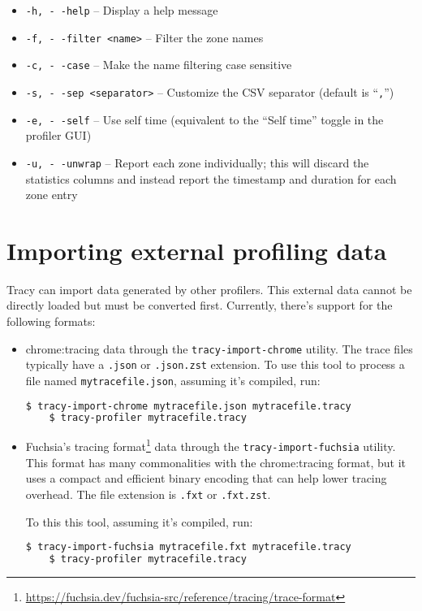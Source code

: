 \documentclass[hidelinks,titlepage,a4paper,twoside]{article}
\begin{document}
\begin{itemize}
  \item \texttt{-h, -\hspace{-1.25ex} -help} -- Display a help message
  \item \texttt{-f, -\hspace{-1.25ex} -filter <name>} -- Filter the zone names
  \item \texttt{-c, -\hspace{-1.25ex} -case} -- Make the name filtering case sensitive
  \item \texttt{-s, -\hspace{-1.25ex} -sep <separator>} -- Customize the CSV separator (default is ``\texttt{,}'')
  \item \texttt{-e, -\hspace{-1.25ex} -self} -- Use self time (equivalent to the ``Self time'' toggle in the profiler GUI)
  \item \texttt{-u, -\hspace{-1.25ex} -unwrap} -- Report each zone individually; this will discard the statistics columns and instead report the timestamp and duration for each zone entry
\end{itemize}

\section{Importing external profiling data}
\label{importingdata}

Tracy can import data generated by other profilers. This external data cannot be directly loaded but must be converted first.
Currently, there's support for the following formats:
\begin{itemize}
  \item chrome:tracing data through the \texttt{tracy-import-chrome} utility. The trace files
    typically have a \texttt{.json} or \texttt{.json.zst} extension.
    To use this tool to process a file named \texttt{mytracefile.json}, assuming it's compiled, run:
    \begin{lstlisting}[language=sh]
    $ tracy-import-chrome mytracefile.json mytracefile.tracy
    $ tracy-profiler mytracefile.tracy
    \end{lstlisting}
  \item Fuchsia's tracing format\footnote{\url{https://fuchsia.dev/fuchsia-src/reference/tracing/trace-format}}
    data through the \texttt{tracy-import-fuchsia} utility.
    This format has many commonalities with the chrome:tracing format, but it uses a
    compact and efficient binary encoding that can help lower tracing overhead.
    The file extension is \texttt{.fxt} or \texttt{.fxt.zst}.

    To this this tool, assuming it's compiled, run:
    \begin{lstlisting}[language=sh]
    $ tracy-import-fuchsia mytracefile.fxt mytracefile.tracy
    $ tracy-profiler mytracefile.tracy
    \end{lstlisting}
\end{itemize}
\end{document}
